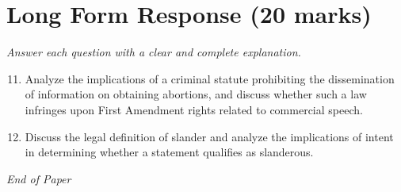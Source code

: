 \documentclass[12pt]{article}
\begin{document}
\section*{Long Form Response (20 marks)}
\textit{Answer each question with a clear and complete explanation.}
\begin{enumerate}[label=\arabic*.]
\setcounter{enumi}{10}
\item Analyze the implications of a criminal statute prohibiting the dissemination of information on obtaining abortions, and discuss whether such a law infringes upon First Amendment rights related to commercial speech.
\item Discuss the legal definition of slander and analyze the implications of intent in determining whether a statement qualifies as slanderous.
\end{enumerate}

\vfill
\noindent\textit{End of Paper}
\end{document}
